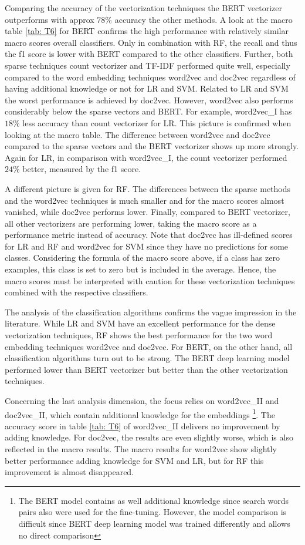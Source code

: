 \documentclass[12pt, a4paper, titlepage]{article}
\begin{document}
Comparing the accuracy of the vectorization techniques the \ac{BERT} vectorizer outperforms with approx $78\%$ accuracy the other methods. A look at the macro table \ref{tab: T6} for BERT confirms the high performance with relatively similar macro scores overall classifiers. Only in combination with \ac{RF}, the recall and thus the f1 score is lower with \ac{BERT} compared to the other classifiers. Further, both sparse techniques count vectorizer and \ac{TF-IDF} performed quite well, especially compared to the word embedding techniques word2vec and doc2vec regardless of having additional knowledge or not for \ac{LR} and \ac{SVM}. Related to \ac{LR} and \ac{SVM} the worst performance is achieved by doc2vec. However, word2vec also performs considerably below the sparse vectors and \ac{BERT}. For example, word2vec\_I has $18\%$ less accuracy than count vectorizer for \ac{LR}. This picture is confirmed when looking at the macro table. The difference between word2vec and doc2vec compared to the sparse vectors and the \ac{BERT} vectorizer shows up more strongly. Again for \ac{LR}, in comparison with word2vec\_I, the count vectorizer performed $24\%$ better, measured by the f1 score. 

A different picture is given for \ac{RF}. The differences between the sparse methods and the word2vec techniques is much smaller and for the macro scores almost vanished, while doc2vec performs lower. Finally, compared to \ac{BERT} vectorizer, all other vectorizers are performing lower, taking the macro score as a performance metric instead of accuracy. Note that doc2vec has ill-defined scores for \ac{LR} and \ac{RF} and word2vec for \ac{SVM} since they have no predictions for some classes. Considering the formula of the macro score above, if a class has zero examples, this class is set to zero but is included in the average. Hence, the macro scores must be interpreted with caution for these vectorization techniques combined with the respective classifiers. 

The analysis of the classification algorithms confirms the vague impression in the literature. While LR and SVM have an excellent performance for the dense vectorization techniques, RF shows the best performance for the two word embedding techniques word2vec and doc2vec. For BERT, on the other hand, all classification algorithms turn out to be strong. The BERT deep learning model performed lower than BERT vectorizer but better than the other vectorization techniques. 

Concerning the last analysis dimension, the focus relies on word2vec\_II and doc2vec\_II, which contain additional knowledge for the embeddings \footnote{The \ac{BERT} model contains as well additional knowledge since search words pairs also were used for the fine-tuning. However, the model comparison is difficult since \ac{BERT} deep learning model was trained differently and allows no direct comparison}. The accuracy score in table \ref{tab: T6}  of word2vec\_II delivers no improvement by adding knowledge. For doc2vec, the results are even slightly worse, which is also reflected in the macro results. The macro results for word2vec show slightly better performance adding knowledge for \ac{SVM} and \ac{LR}, but for \ac{RF} this improvement is almost disappeared.
\end{document}
